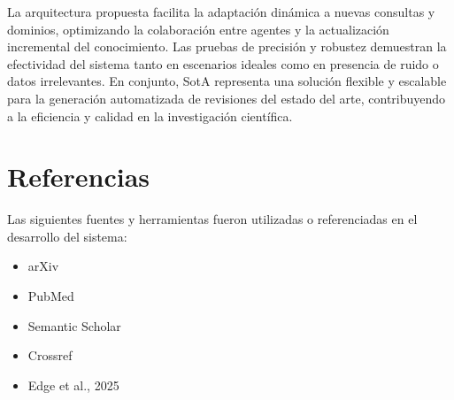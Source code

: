 \documentclass[12pt]{article}
\begin{document}
La arquitectura propuesta facilita la adaptación dinámica a nuevas consultas y dominios, optimizando la colaboración entre agentes y la actualización incremental del conocimiento. Las pruebas de precisión y robustez demuestran la efectividad del sistema tanto en escenarios ideales como en presencia de ruido o datos irrelevantes. En conjunto, SotA representa una solución flexible y escalable para la generación automatizada de revisiones del estado del arte, contribuyendo a la eficiencia y calidad en la investigación científica.

\section{Referencias}

Las siguientes fuentes y herramientas fueron utilizadas o referenciadas en el desarrollo del sistema: 
\begin{itemize}
    \item arXiv~\cite{arxiv}
    \item PubMed~\cite{pubmed}
    \item Semantic Scholar~\cite{semanticscholar}
    \item Crossref~\cite{crossref}
    \item Edge et al., 2025~\cite{edge2025localglobalgraphrag}
\end{itemize}



\end{document}
